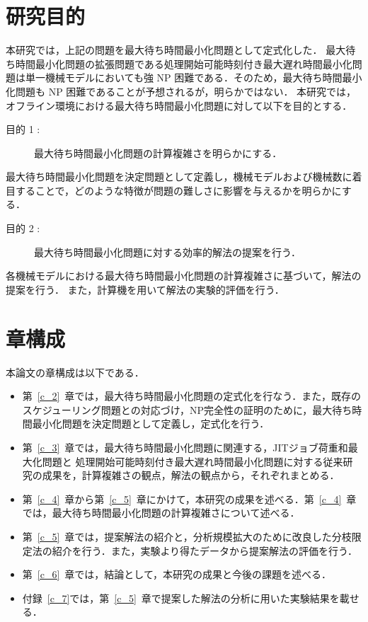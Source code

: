 \documentclass[12pt]{optlab-bachelor}
\begin{document}
\section{研究目的}
本研究では，上記の問題を最大待ち時間最小化問題として定式化した．
最大待ち時間最小化問題の拡張問題である処理開始可能時刻付き最大遅れ時間最小化問題は単一機械モデルにおいても強 NP  困難である．そのため，最大待ち時間最小化問題も NP 困難であることが予想されるが，明らかではない．
本研究では，オフライン環境における最大待ち時間最小化問題に対して以下を目的とする．
\begin{description}
  \item[目的 1 :]
  最大待ち時間最小化問題の計算複雑さを明らかにする．
\end{description}

最大待ち時間最小化問題を決定問題として定義し，機械モデルおよび機械数に着目することで，どのような特徴が問題の難しさに影響を与えるかを明らかにする．

\begin{description}
  \item[目的 2 :]
  最大待ち時間最小化問題に対する効率的解法の提案を行う．
\end{description}

各機械モデルにおける最大待ち時間最小化問題の計算複雑さに基づいて，解法の提案を行う．
また，計算機を用いて解法の実験的評価を行う．

\section{章構成}
本論文の章構成は以下である．
\begin{itemize}
  \item 第~\ref{c_2}~章では，最大待ち時間最小化問題の定式化を行なう．また，既存のスケジューリング問題との対応づけ，NP完全性の証明のために，最大待ち時間最小化問題を決定問題として定義し，定式化を行う．
  \item 第~\ref{c_3}~章では，最大待ち時間最小化問題に関連する，JITジョブ荷重和最大化問題と
  処理開始可能時刻付き最大遅れ時間最小化問題に対する従来研究の成果を，計算複雑さの観点，解法の観点から，それぞれまとめる．
  \item 第~\ref{c_4}~章から第~\ref{c_5}~章にかけて，本研究の成果を述べる．第~\ref{c_4}~章では，最大待ち時間最小化問題の計算複雑さについて述べる．
  \item 第~\ref{c_5}~章では，提案解法の紹介と，分析規模拡大のために改良した分枝限定法の紹介を行う．また，実験より得たデータから提案解法の評価を行う．
  \item 第~\ref{c_6}~章では，結論として，本研究の成果と今後の課題を述べる．
  \item 付録~\ref{c_7}では，第~\ref{c_5}~章で提案した解法の分析に用いた実験結果を載せる．
\end{itemize}
\end{document}
